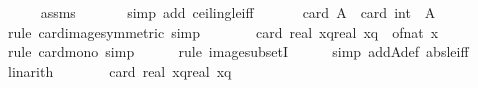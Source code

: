 \begin{isabellebody}
\ \ \ \ \isamarkupfalse%
\ assms\ \isanewline
\ \ \ \ \isamarkupfalse%
\ {\isacharparenleft}{\kern0pt}simp\ add{\isacharcolon}{\kern0pt}\ ceiling{\isacharunderscore}{\kern0pt}le{\isacharunderscore}{\kern0pt}iff{\isacharparenright}{\kern0pt}\isanewline
\ \ \isanewline
\ \ \isamarkupfalse%
\ {\isachardoublequoteopen}card\ A\ {\isacharequal}{\kern0pt}\ card\ {\isacharparenleft}{\kern0pt}int\ {\isacharbackquote}{\kern0pt}\ A{\isacharparenright}{\kern0pt}{\isachardoublequoteclose}\isanewline
\ \ \ \ \isamarkupfalse%
\ {\isacharparenleft}{\kern0pt}rule\ card{\isacharunderscore}{\kern0pt}image{\isacharbrackleft}{\kern0pt}symmetric{\isacharbrackright}{\kern0pt}{\isacharcomma}{\kern0pt}\ simp{\isacharparenright}{\kern0pt}\isanewline
\ \ \isamarkupfalse%
\ \isamarkupfalse%
\ {\isachardoublequoteopen}{\isachardot}{\kern0pt}{\isachardot}{\kern0pt}{\isachardot}{\kern0pt}\ {\isasymle}\ card\ {\isacharparenleft}{\kern0pt}{\isacharbraceleft}{\kern0pt}{\isasymlceil}real\ x{\isacharminus}{\kern0pt}q{\isasymrceil}{\isachardot}{\kern0pt}{\isachardot}{\kern0pt}{\isasymlfloor}real\ x{\isacharplus}{\kern0pt}q{\isasymrfloor}{\isacharbraceright}{\kern0pt}\ {\isacharminus}{\kern0pt}\ {\isacharbraceleft}{\kern0pt}of{\isacharunderscore}{\kern0pt}nat\ x{\isacharbraceright}{\kern0pt}{\isacharparenright}{\kern0pt}{\isachardoublequoteclose}\isanewline
\ \ \ \ \isamarkupfalse%
\ {\isacharparenleft}{\kern0pt}rule\ card{\isacharunderscore}{\kern0pt}mono{\isacharcomma}{\kern0pt}\ simp{\isacharparenright}{\kern0pt}\isanewline
\ \ \ \ \isamarkupfalse%
\ {\isacharparenleft}{\kern0pt}rule\ image{\isacharunderscore}{\kern0pt}subsetI{\isacharparenright}{\kern0pt}\isanewline
\ \ \ \ \isamarkupfalse%
\ {\isacharparenleft}{\kern0pt}simp\ add{\isacharcolon}{\kern0pt}A{\isacharunderscore}{\kern0pt}def\ abs{\isacharunderscore}{\kern0pt}le{\isacharunderscore}{\kern0pt}iff{\isacharparenright}{\kern0pt}\isanewline
\ \ \ \ \isamarkupfalse%
\ linarith\isanewline
\ \ \isamarkupfalse%
\ \isamarkupfalse%
\ {\isachardoublequoteopen}{\isachardot}{\kern0pt}{\isachardot}{\kern0pt}{\isachardot}{\kern0pt}\ {\isacharequal}{\kern0pt}\ card\ {\isacharbraceleft}{\kern0pt}{\isasymlceil}real\ x{\isacharminus}{\kern0pt}q{\isasymrceil}{\isachardot}{\kern0pt}{\isachardot}{\kern0pt}{\isasymlfloor}real\ x{\isacharplus}{\kern0pt}q{\isasymrfloor}{\isacharbraceright}{\kern0pt}\ {\isacharminus}{\kern0pt}\ {}{\isachardoublequoteclose}\isanewline

\end{isabellebody}
